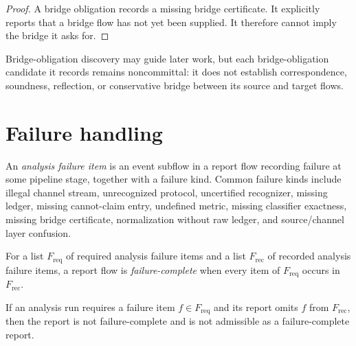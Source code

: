\begin{proof}
A bridge obligation records a missing bridge certificate. It explicitly reports that a bridge flow has not yet been supplied. It therefore cannot imply the bridge it asks for.
\end{proof}

\begin{corollary}
\label{cor:analysis-pipeline-bridge-discovery-noncommittal}
Bridge-obligation discovery may guide later work, but each bridge-obligation candidate it records remains noncommittal: it does not establish correspondence, soundness, reflection, or conservative bridge between its source and target flows.
\end{corollary}

\section{Failure handling}
\label{sec:analysis-pipeline-failure-handling}

\begin{definition}
\label{def:analysis-pipeline-failure-item}
An \emph{analysis failure item} is an event subflow in a report flow recording failure at some pipeline stage, together with a failure kind. Common failure kinds include illegal channel stream, unrecognized protocol, uncertified recognizer, missing ledger, missing cannot-claim entry, undefined metric, missing classifier exactness, missing bridge certificate, normalization without raw ledger, and source/channel layer confusion.
\end{definition}

\begin{definition}
\label{def:analysis-pipeline-failure-complete-report}
For a list $F_{\mathrm{req}}$ of required analysis failure items and a list $F_{\mathrm{rec}}$ of recorded analysis failure items, a report flow is \emph{failure-complete} when every item of $F_{\mathrm{req}}$ occurs in $F_{\mathrm{rec}}$.
\end{definition}

\begin{theorem}
\label{thm:analysis-pipeline-non-failure-complete-inadmissible}
If an analysis run requires a failure item $f\in F_{\mathrm{req}}$ and its report omits $f$ from $F_{\mathrm{rec}}$, then the report is not failure-complete and is not admissible as a failure-complete report.
\end{theorem}

